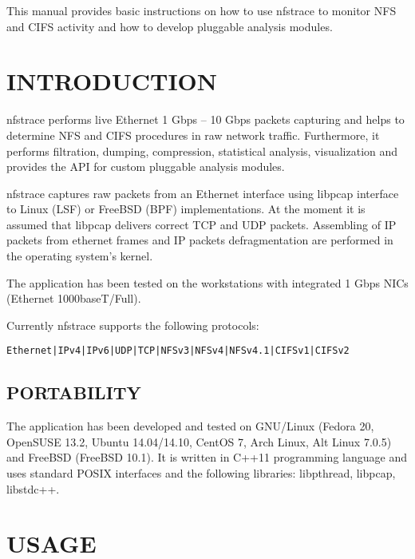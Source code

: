 \documentclass[oneside]{article}
\newcommand{\gls}{}
\newcommand*{\textfile}[1]{\textsf{#1}}
\newcommand*{\textprog}[1]{\textfile{#1}}
\begin{document}
\vspace{5mm} This manual provides basic instructions on how to use \textprog{nfstrace} to
monitor \gls{NFS} and \gls{CIFS} activity and how to develop pluggable analysis
modules.

\newpage 

\tableofcontents

\newpage

\section{INTRODUCTION}

\textprog{nfstrace} performs live Ethernet 1 Gbps – 10 Gbps packets capturing and helps to
determine \gls{NFS} and \gls{CIFS} procedures in raw network traffic.
Furthermore, it performs filtration, dumping, compression, statistical
analysis, visualization and provides the API for custom pluggable analysis
modules. 

\textprog{nfstrace} captures raw packets from an Ethernet interface using libpcap
interface to Linux (\gls{LSF}) or FreeBSD (\gls{BPF}) implementations. At the
moment it is assumed that libpcap delivers correct TCP and UDP packets.
Assembling of IP packets from ethernet frames and IP packets defragmentation
are performed in the operating system's kernel.

The application has been tested on the workstations with integrated 1 Gbps
\gls{NIC}s (Ethernet 1000baseT/Full).

Currently \textprog{nfstrace} supports the following protocols:
\begin{alltt}
Ethernet | IPv4 | IPv6 | UDP | TCP |  NFSv3 | NFSv4 | NFSv4.1 | CIFSv1 | CIFSv2
\end{alltt}


\subsection{PORTABILITY}

The application has been developed and tested on GNU/Linux (Fedora 20, OpenSUSE
13.2, Ubuntu 14.04/14.10, CentOS 7, Arch Linux, Alt Linux 7.0.5) and FreeBSD
(FreeBSD 10.1). It is written in C++11 programming language and uses standard
\gls{POSIX} interfaces and the following libraries: libpthread, libpcap,
libstdc++.  

\section{USAGE}
\end{document}

